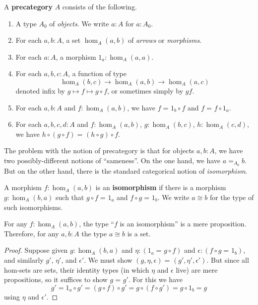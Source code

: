 \documentclass{amsart}
\newcommand{\id}[3][]{\ensuremath{#2 =_{#1} #3}\xspace}
\theoremstyle{definition}
\theoremstyle{remark}
\numberwithin{equation}{section}
\begin{document}
\begin{defn}\label{ct:precategory}
  A \textbf{precategory} $A$ consists of the following.
  \begin{enumerate}
  \item A type $A_0$ of \emph{objects}.  We write $a:A$ for $a:A_0$.
  \item For each $a,b:A$, a set $\hom_A(a,b)$ of \emph{arrows} or \emph{morphisms}.
  \item For each $a:A$, a morphism $1_a:\hom_A(a,a)$.
  \item For each $a,b,c:A$, a function of type
    \[  \hom_A(b,c) \to \hom_A(a,b) \to \hom_A(a,c) \]
    denoted infix by $g\mapsto f\mapsto g\circ f$, or sometimes simply by $gf$.
  \item For each $a,b:A$ and $f:\hom_A(a,b)$, we have $\id f {1_b\circ f}$ and $\id f {f\circ 1_a}$.
  \item For each $a,b,c,d:A$ and $f:\hom_A(a,b)$, $g:\hom_A(b,c)$, $h:\hom_A(c,d)$, we have $\id {h\circ (g\circ f)}{(h\circ g)\circ f}$.
  \end{enumerate}
\end{defn}

The problem with the notion of precategory is that for objects $a,b:A$, we have two possibly-different notions of ``sameness''.
On the one hand, we have $\id[A_0]{a}{b}$.
But on the other hand, there is the standard categorical notion of \emph{isomorphism}.

\begin{defn}\label{ct:isomorphism}
  A morphism $f:\hom_A(a,b)$ is an \textbf{isomorphism} if there is a morphism $g:\hom_A(b,a)$ such that $\id{g\circ f}{1_a}$ and $\id{f\circ g}{1_b}$.
  We write $a\cong b$ for the type of such isomorphisms.
\end{defn}

\begin{lem}\label{ct:isoprop}
  For any $f:\hom_A(a,b)$, the type ``$f$ is an isomorphism'' is a mere proposition.
  Therefore, for any $a,b:A$ the type $a\cong b$ is a set.
\end{lem}
\begin{proof}
  Suppose given $g:\hom_A(b,a)$ and $\eta:(\id{1_a}{g\circ f})$ and $\epsilon:(\id{f\circ g}{1_b})$, and similarly $g'$, $\eta'$, and $\epsilon'$.
We must show $\id{(g,\eta,\epsilon)}{(g',\eta',\epsilon')}$.
  But since all hom-sets are sets, their identity types (in which $\eta$ and $\epsilon$ live) are mere propositions, so it suffices to show $\id g {g'}$.
  For this we have
  \[g' = 1_a\circ g' = (g\circ f)\circ g' = g\circ (f\circ g') = g\circ 1_b = g\]
  using $\eta$ and $\epsilon'$.
\end{proof}
\end{document}

